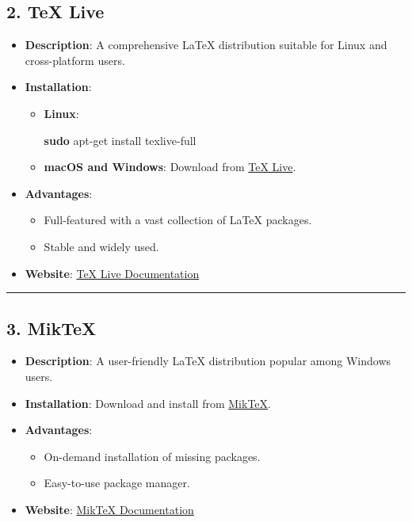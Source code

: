 \documentclass[
]{book}
\newenvironment{Shaded}{\begin{snugshade}}{\end{snugshade}}
\newcommand{\FunctionTok}[1]{\textcolor[rgb]{0.13,0.29,0.53}{\textbf{#1}}}
\newcommand{\NormalTok}[1]{#1}
\providecommand{\tightlist}{%
  \setlength{\itemsep}{0pt}\setlength{\parskip}{0pt}}
\theoremstyle{definition}
\theoremstyle{definition}
\theoremstyle{definition}
\theoremstyle{definition}
\theoremstyle{remark}
\begin{document}
\subsection{\texorpdfstring{2. \textbf{TeX Live}}{2. TeX Live}}\label{tex-live}

\begin{itemize}
\tightlist
\item
  \textbf{Description}: A comprehensive LaTeX distribution suitable for Linux and cross-platform users.
\item
  \textbf{Installation}:

  \begin{itemize}
  \item
    \textbf{Linux}:

\begin{Shaded}
\begin{Highlighting}[]
\FunctionTok{sudo}\NormalTok{ apt{-}get install texlive{-}full}
\end{Highlighting}
\end{Shaded}
  \item
    \textbf{macOS and Windows}: Download from \href{https://www.tug.org/texlive/}{TeX Live}.
  \end{itemize}
\item
  \textbf{Advantages}:

  \begin{itemize}
  \tightlist
  \item
    Full-featured with a vast collection of LaTeX packages.
  \item
    Stable and widely used.
  \end{itemize}
\item
  \textbf{Website}: \href{https://www.tug.org/texlive/}{TeX Live Documentation}
\end{itemize}

\begin{center}\rule{0.5\linewidth}{0.5pt}\end{center}

\subsection{\texorpdfstring{3. \textbf{MikTeX}}{3. MikTeX}}\label{miktex}

\begin{itemize}
\tightlist
\item
  \textbf{Description}: A user-friendly LaTeX distribution popular among Windows users.
\item
  \textbf{Installation}: Download and install from \href{https://miktex.org/}{MikTeX}.
\item
  \textbf{Advantages}:

  \begin{itemize}
  \tightlist
  \item
    On-demand installation of missing packages.
  \item
    Easy-to-use package manager.
  \end{itemize}
\item
  \textbf{Website}: \href{https://miktex.org/}{MikTeX Documentation}
\end{itemize}
\end{document}
